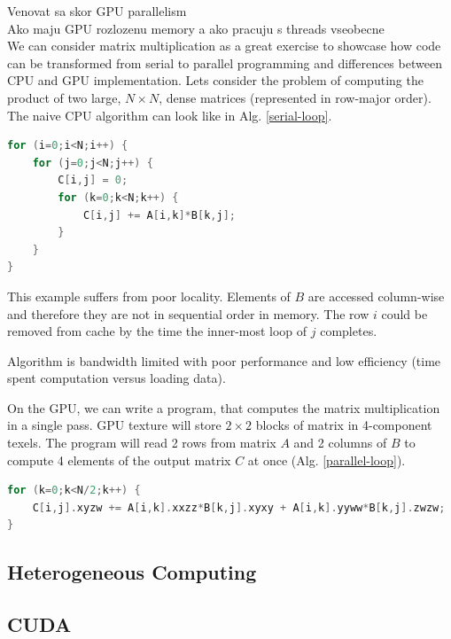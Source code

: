 Venovat sa skor GPU parallelism \\
Ako maju GPU rozlozenu memory a ako pracuju s threads vseobecne\\

We can consider matrix multiplication as a great exercise to showcase how code can be transformed from serial to parallel programming and differences between CPU and GPU implementation. Lets consider the problem of computing the product of two large, $N \times N$, dense matrices (represented in row-major order). The naive CPU algorithm can look like in Alg. \ref{serial-loop}.

\begin{lstlisting}[language=Cpp, caption=Pseudocode with serial loop., label=serial-loop]
for (i=0;i<N;i++) {
	for (j=0;j<N;j++) {
		C[i,j] = 0;
		for (k=0;k<N;k++) {
			C[i,j] += A[i,k]*B[k,j];
		}
	}
}
\end{lstlisting}

This example suffers from poor locality. Elements of $B$ are accessed column-wise and therefore they are not in sequential order in memory. The row $i$ could be removed from cache by the time the inner-most loop of $j$ completes. 

Algorithm is bandwidth limited with poor performance and low efficiency (time spent computation versus loading data).

On the GPU, we can write a program, that computes the matrix multiplication in a single pass. GPU texture will store $2 \times 2$ blocks of matrix in 4-component texels. The program will read 2 rows from matrix $A$ and 2 columns of $B$ to compute 4 elements of the output matrix $C$ at once (Alg. \ref{parallel-loop}).

\begin{lstlisting}[language=Cpp, caption=Pseudocode with serial loop., label=parallel-loop]
for (k=0;k<N/2;k++) {
	C[i,j].xyzw += A[i,k].xxzz*B[k,j].xyxy + A[i,k].yyww*B[k,j].zwzw;
}
\end{lstlisting}




\subsection{Heterogeneous Computing}

\subsection{CUDA}

